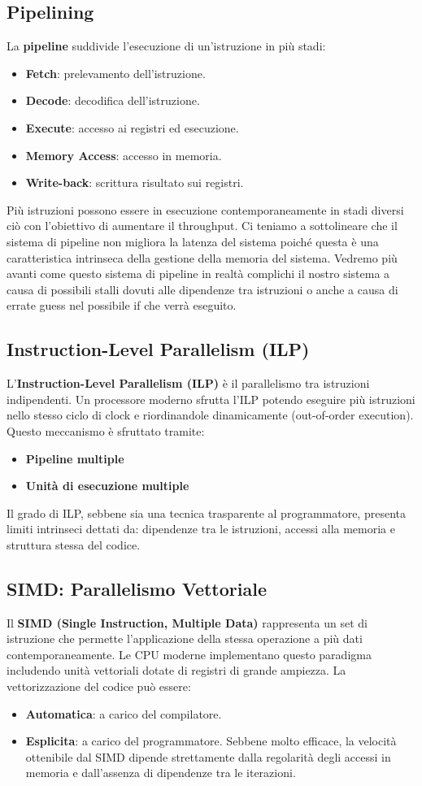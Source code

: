 \subsection{Pipelining}
La \textbf{pipeline} suddivide l’esecuzione di un’istruzione in più stadi:
\begin{itemize}
    \item \textbf{Fetch}: prelevamento dell'istruzione.
    \item \textbf{Decode}: decodifica dell'istruzione.
    \item \textbf{Execute}: accesso ai registri ed esecuzione.
    \item \textbf{Memory Access}: accesso in memoria.
    \item \textbf{Write-back}: scrittura risultato sui registri.
\end{itemize}
Più istruzioni possono essere in esecuzione contemporaneamente in stadi diversi ciò con l’obiettivo di aumentare il throughput. Ci teniamo a sottolineare che il sistema di pipeline non migliora la latenza del sistema poiché questa è una caratteristica intrinseca della gestione della memoria del sistema.
Vedremo più avanti come questo sistema di pipeline in realtà complichi il nostro sistema a causa di possibili stalli dovuti alle dipendenze tra istruzioni o anche a causa di errate guess nel possibile if che verrà eseguito.
\subsection{Instruction-Level Parallelism (ILP)}
L'\textbf{Instruction-Level Parallelism (ILP)} è il parallelismo tra istruzioni indipendenti. Un processore moderno sfrutta l'ILP potendo eseguire più istruzioni nello stesso ciclo di clock e riordinandole dinamicamente (out-of-order execution).
Questo meccanismo è sfruttato tramite:
\begin{itemize}
    \item \textbf{Pipeline multiple}
    \item \textbf{Unità di esecuzione multiple}
\end{itemize}
Il grado di ILP, sebbene sia una tecnica trasparente al programmatore, presenta limiti intrinseci dettati da: dipendenze tra le istruzioni, accessi alla memoria e struttura stessa del codice.
\subsection{SIMD: Parallelismo Vettoriale}
Il \textbf{SIMD (Single Instruction, Multiple Data)} rappresenta un set di istruzione che permette l'applicazione della stessa operazione a più dati contemporaneamente. Le CPU moderne implementano questo paradigma includendo unità vettoriali dotate di registri di grande ampiezza.
La vettorizzazione del codice può essere:
\begin{itemize}
    \item \textbf{Automatica}: a carico del compilatore.
    \item \textbf{Esplicita}: a carico del programmatore. Sebbene molto efficace, la velocità ottenibile dal SIMD dipende strettamente dalla regolarità degli accessi in memoria e dall'assenza di dipendenze tra le iterazioni.
\end{itemize}
